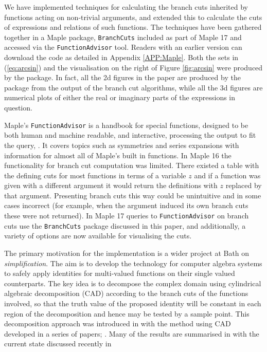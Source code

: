 \documentclass{llncs}
\begin{document}
We have implemented techniques for calculating the branch cuts inherited by functions acting on non-trivial arguments, and extended this to calculate the cuts of expressions and relations of such functions.  The techniques have been gathered together in a {\sc Maple} package, \texttt{BranchCuts} included as part of {\sc Maple 17} and accessed via the \texttt{FunctionAdvisor} tool. Readers with an earlier version can download the code as detailed in Appendix \ref{APP:Maple}.  Both the sets in (\ref{eq:arcsin}) and the visualisation on the right of Figure \ref{fig:arcsin} were produced by the package.  In fact, all the 2d figures in the paper are produced by the package from the output of the branch cut algorithms, while all the 3d figures are numerical plots of either the real or imaginary parts of the expressions in question.  

{\sc Maple}'s \texttt{FunctionAdvisor} is a handbook for special functions, designed to be both human and machine readable, and interactive, processing the output to fit the query, \cite{ChebTerrab2002}.  It covers topics such as symmetries and series expansions with information for almost all of {\sc Maple}'s built in functions.  In {\sc Maple 16} the functionality for branch cut computation was limited.  There existed a table with the defining cuts for most functions in terms of a variable $z$ and if a function was given with a different argument it would return the definitions with $z$ replaced by that argument.  Presenting branch cuts this way could be unintuitive and in some cases incorrect (for example, when the argument induced its own branch cuts these were not returned).  In {\sc Maple 17} queries to \texttt{FunctionAdvisor} on branch cuts use the \texttt{BranchCuts} package discussed in this paper, and additionally, a variety of options are now available for visualising the cuts. 

The primary motivation for the implementation is a wider project at Bath on \textit{simplification}.  The aim is to develop the technology for computer algebra systems  to safely apply identities for multi-valued functions on their single valued counterparts.  The key idea is to decompose the complex domain using cylindrical algebraic decomposition (CAD) according to the branch cuts of the functions involved, so that the truth value of the proposed identity will be constant in each region of the decomposition and hence may be tested by a sample point.  This decomposition approach was introduced in \cite{DF94} with the method using CAD developed in a series of papers;
\cite{BD02, BD03, BBDP04, BPB05, BBDP07, PBD10}. 
Many of the results are summarised in \cite{Phisanbut11} with the current state discussed recently in \cite{DBEW12}
\end{document}
